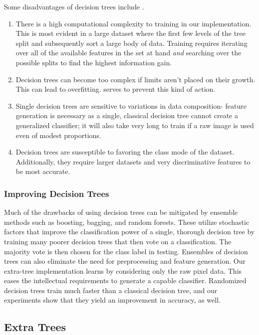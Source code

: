 Some disadvantages of decision trees include \cite{scikit:decisiontrees}.
%
\begin{enumerate}
\item There is a high computational complexity to training in our implementation. This is most evident in a large dataset where the first few levels of the tree split and subsequently sort a large body of data. Training requires iterating over all of the available features in the set at hand \emph{and} searching over the possible splits to find the highest information gain.
\item Decision trees can become too complex if limits aren't placed on their growth. This can lead to overfitting.  serves to prevent this kind of action.
\item Single decision trees are sensitive to variations in data composition- feature generation is necessary as a single, classical decision tree cannot create a generalized classifier; it will also take very long to train if a raw image is used even of modest proportions.
\item Decision trees are susceptible to favoring the class mode of the dataset. Additionally, they require larger datasets and very discriminative features to be most accurate.
\end{enumerate}

\subsubsection{Improving Decision Trees}

Much of the drawbacks of using decision trees can be mitigated by ensemble methods such as boosting, bagging, and random forests. These utilize stochastic factors that improve the classification power of a single, thorough decision tree by training many poorer decision trees that then vote on a classification. The majority vote is then chosen for the class label in testing. Ensembles of decision trees can also eliminate the need for preprocessing and feature generation. Our extra-tree implementation learns by considering only the raw pixel data. This eases the intellectual requirements to generate a capable classifier. Randomized decision trees train much faster than a classical decision tree, and our experiments show that they yield an improvement in accuracy, as well.

\subsection{Extra Trees}
